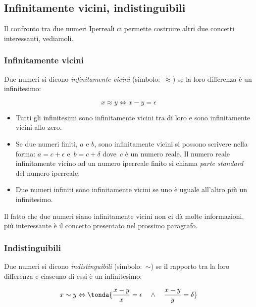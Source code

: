\subsection{Infinitamente vicini, indistinguibili}
\label{subsec:insnum_infvicindist}

Il confronto tra due numeri Iperreali ci permette costruire altri due 
concetti 
interessanti, vediamoli. 

\subsubsection{Infinitamente vicini}
\label{subsec:insnum_infinitamentevicini}

\begin{definizione}
Due numeri si dicono \emph{infinitamente vicini} (simbolo:~$\approx$) se 
la loro differenza è un infinitesimo: 

\[x \approx y \Leftrightarrow x - y = \epsilon\]

\end{definizione}

\begin{itemize} [noitemsep]
 \item 
Tutti gli infinitesimi sono infinitamente vicini tra di loro e sono 
infinitamente vicini allo zero.
 \item
Se due numeri finiti, $a$ e $b$, sono infinitamente vicini si possono 
scrivere nella forma: $a = c + \epsilon$ e~$b = c + \delta$ dove~$c$ è un 
numero reale. Il numero reale infinitamente vicino ad un numero iperreale 
finito si chiama \emph{parte standard} del numero iperreale.
 \item
Due numeri infiniti sono infinitamente vicini se uno è uguale all'altro più 
un 
infinitesimo.
\end{itemize}

Il fatto che due numeri siano infinitamente vicini non ci dà molte 
informazioni, più interessante è il concetto presentato nel prossimo 
paragrafo.

\subsubsection{Indistinguibili}
\label{subsec:insnum_indistinguibili}

\begin{definizione}
Due numeri si dicono \emph{indistinguibili} (simbolo:~$\sim$) se il 
rapporto tra la loro differenza e ciascuno di essi è un infinitesimo:

\[x \sim y \Leftrightarrow 
\tonda{\frac{x-y}{x} = \epsilon \quad \wedge \quad \frac{x-y}{y} = \delta}
\]

\end{definizione}

